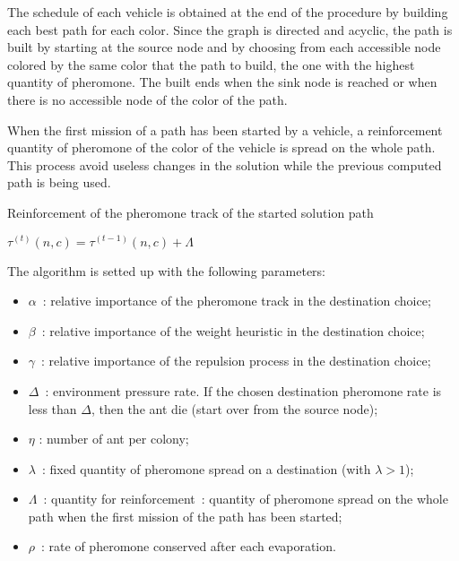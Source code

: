 \documentclass[a4paper,10pt]{article}
\begin{document}
The schedule of each vehicle is obtained at the end of the procedure by building each best path for each color. Since the graph is directed and acyclic, the path is built by starting at the source node and by choosing from each accessible node colored by the same color that the path to build, the one with the highest quantity of pheromone. The built ends when the sink node is reached or when there is no accessible node of the color of the path.


When the first mission of a path has been started by a vehicle, a reinforcement quantity of pheromone of the color of the vehicle is spread on the whole path. This process avoid useless changes in the solution while the previous computed path is being used.


\begin{algorithm}
\caption{Reinforcement of the pheromone track of the started solution path}
\label{algoReinforcement}
\begin{algorithmic} 
\STATE $\tau^{(t)}(n,c) =  \tau^{(t-1)}(n,c) + \Lambda$
\ENDFOR
\end{algorithmic}
\end{algorithm}

The algorithm is setted up with the following parameters:

\begin{itemize}
 \item $\alpha$ : relative importance of the pheromone track in the destination choice;
 \item $\beta$ :  relative importance of the weight heuristic in the destination choice;
 \item $\gamma$ : relative importance of the repulsion process in the destination choice;
 \item $\Delta$ : environment pressure rate. If the chosen destination pheromone rate is less than $\Delta$, then the ant die (start over from the source node);
 \item $\eta$ : number of ant per colony;
 \item $\lambda$ : fixed quantity of pheromone spread on a destination (with $\lambda > 1$);
 \item $\Lambda$ : quantity for reinforcement : quantity of pheromone spread on the whole path when the first mission of the path has been started;
 \item $\rho$ : rate of pheromone conserved after each evaporation.
\end{itemize}
\end{document}
